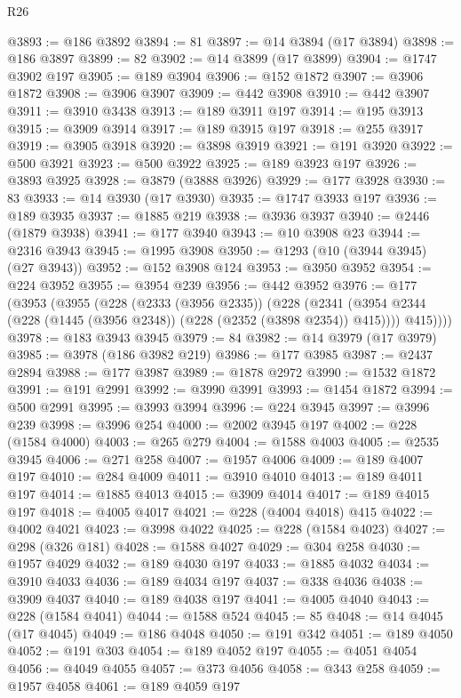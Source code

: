 \begin{lexlean}{R26}
\begin{coremodule}
@3893 := @186 @3892
@3894 := 81
@3897 := @14 @3894 (@17 @3894)
@3898 := @186 @3897
@3899 := 82
@3902 := @14 @3899 (@17 @3899)
@3904 := @1747 @3902 @197
@3905 := @189 @3904
@3906 := @152 @1872
@3907 := @3906 @1872
@3908 := @3906 @3907
@3909 := @442 @3908
@3910 := @442 @3907
@3911 := @3910 @3438
@3913 := @189 @3911 @197
@3914 := @195 @3913
@3915 := @3909 @3914
@3917 := @189 @3915 @197
@3918 := @255 @3917
@3919 := @3905 @3918
@3920 := @3898 @3919
@3921 := @191 @3920
@3922 := @500 @3921
@3923 := @500 @3922
@3925 := @189 @3923 @197
@3926 := @3893 @3925
@3928 := @3879 (@3888 @3926)
@3929 := @177 @3928
@3930 := 83
@3933 := @14 @3930 (@17 @3930)
@3935 := @1747 @3933 @197
@3936 := @189 @3935
@3937 := @1885 @219
@3938 := @3936 @3937
@3940 := @2446 (@1879 @3938)
@3941 := @177 @3940
@3943 := @10 @3908 @23
@3944 := @2316 @3943
@3945 := @1995 @3908
@3950 := @1293 (@10 (@3944 @3945) (@27 @3943))
@3952 := @152 @3908 @124
@3953 := @3950 @3952
@3954 := @224 @3952
@3955 := @3954 @239
@3956 := @442 @3952
@3976 := @177
    (@3953
      (@3955
        (@228
          (@2333 (@3956 @2335))
          (@228
            (@2341 (@3954 @2344 (@228 (@1445 (@3956 @2348)) (@228 (@2352 (@3898 @2354)) @415))))
            @415))))
@3978 := @183 @3943 @3945
@3979 := 84
@3982 := @14 @3979 (@17 @3979)
@3985 := @3978 (@186 @3982 @219)
@3986 := @177 @3985
@3987 := @2437 @2894
@3988 := @177 @3987
@3989 := @1878 @2972
@3990 := @1532 @1872
@3991 := @191 @2991
@3992 := @3990 @3991
@3993 := @1454 @1872
@3994 := @500 @2991
@3995 := @3993 @3994
@3996 := @224 @3945
@3997 := @3996 @239
@3998 := @3996 @254
@4000 := @2002 @3945 @197
@4002 := @228 (@1584 @4000)
@4003 := @265 @279
@4004 := @1588 @4003
@4005 := @2535 @3945
@4006 := @271 @258
@4007 := @1957 @4006
@4009 := @189 @4007 @197
@4010 := @284 @4009
@4011 := @3910 @4010
@4013 := @189 @4011 @197
@4014 := @1885 @4013
@4015 := @3909 @4014
@4017 := @189 @4015 @197
@4018 := @4005 @4017
@4021 := @228 (@4004 @4018) @415
@4022 := @4002 @4021
@4023 := @3998 @4022
@4025 := @228 (@1584 @4023)
@4027 := @298 (@326 @181)
@4028 := @1588 @4027
@4029 := @304 @258
@4030 := @1957 @4029
@4032 := @189 @4030 @197
@4033 := @1885 @4032
@4034 := @3910 @4033
@4036 := @189 @4034 @197
@4037 := @338 @4036
@4038 := @3909 @4037
@4040 := @189 @4038 @197
@4041 := @4005 @4040
@4043 := @228 (@1584 @4041)
@4044 := @1588 @524
@4045 := 85
@4048 := @14 @4045 (@17 @4045)
@4049 := @186 @4048
@4050 := @191 @342
@4051 := @189 @4050
@4052 := @191 @303
@4054 := @189 @4052 @197
@4055 := @4051 @4054
@4056 := @4049 @4055
@4057 := @373 @4056
@4058 := @343 @258
@4059 := @1957 @4058
@4061 := @189 @4059 @197

\end{coremodule}
\end{lexlean}
